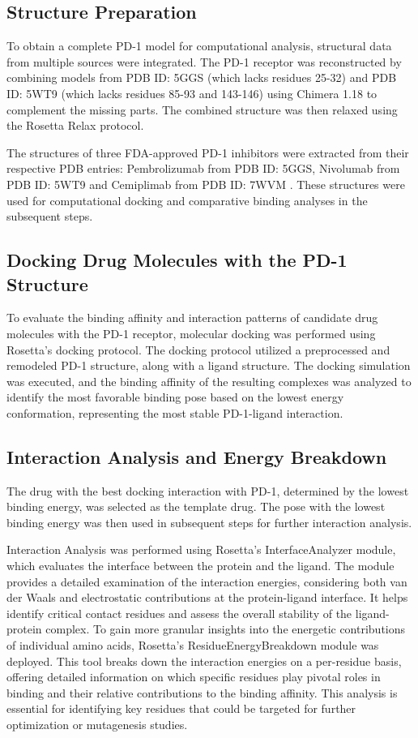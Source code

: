 \documentclass[11pt]{article}
\begin{document}
\subsection{Structure Preparation}  
To obtain a complete PD-1 model for computational analysis, structural data from multiple sources were integrated. The PD-1 receptor was reconstructed by combining models from PDB ID: 5GGS \cite{lee2016} (which lacks residues 25-32) and PDB ID: 5WT9 \cite{tan2017} (which lacks residues 85-93 and 143-146) using Chimera 1.18 to complement the missing parts. The combined structure was then relaxed using the Rosetta Relax protocol.

The structures of three FDA-approved PD-1 inhibitors were extracted from their respective PDB entries: Pembrolizumab from PDB ID: 5GGS, Nivolumab from PDB ID: 5WT9 and Cemiplimab from PDB ID: 7WVM \cite{lu2022}. These structures were used for computational docking and comparative binding analyses in the subsequent steps.

\subsection{Docking Drug Molecules with the PD-1 Structure}  
To evaluate the binding affinity and interaction patterns of candidate drug molecules with the PD-1 receptor, molecular docking was performed using Rosetta's docking protocol. The docking protocol utilized a preprocessed and remodeled PD-1 structure, along with a ligand structure. The docking simulation was executed, and the binding affinity of the resulting complexes was analyzed to identify the most favorable binding pose based on the lowest energy conformation, representing the most stable PD-1-ligand interaction.

\subsection{Interaction Analysis and Energy Breakdown}  
The drug with the best docking interaction with PD-1, determined by the lowest binding energy, was selected as the template drug. The pose with the lowest binding energy was then used in subsequent steps for further interaction analysis.

Interaction Analysis was performed using Rosetta's InterfaceAnalyzer module, which evaluates the interface between the protein and the ligand. The module provides a detailed examination of the interaction energies, considering both van der Waals and electrostatic contributions at the protein-ligand interface. It helps identify critical contact residues and assess the overall stability of the ligand-protein complex. To gain more granular insights into the energetic contributions of individual amino acids, Rosetta’s ResidueEnergyBreakdown module was deployed. This tool breaks down the interaction energies on a per-residue basis, offering detailed information on which specific residues play pivotal roles in binding and their relative contributions to the binding affinity. This analysis is essential for identifying key residues that could be targeted for further optimization or mutagenesis studies.
\end{document}
